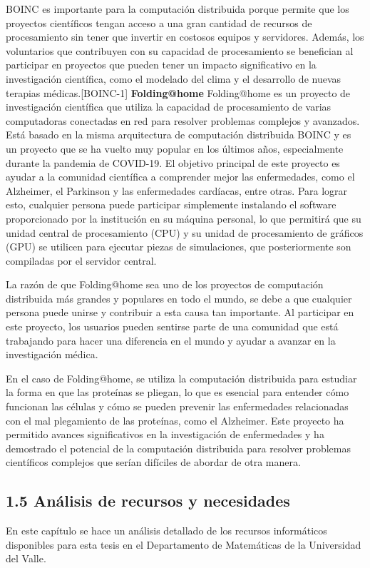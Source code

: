 \begin{doublespace}
\begin{multicols}{2}
  BOINC es importante para la computación distribuida porque permite que los proyectos científicos tengan acceso a una gran cantidad de recursos de procesamiento sin tener que invertir en costosos equipos y servidores. Además, los voluntarios que contribuyen con su capacidad de procesamiento se benefician al participar en proyectos que pueden tener un impacto significativo en la investigación científica, como el modelado del clima y el desarrollo de nuevas terapias médicas.[BOINC-1]
  \newpage
  \textbf{Folding@home}
  \newline
  Folding@home es un proyecto de investigación científica que utiliza la capacidad de procesamiento de varias computadoras conectadas en red para resolver problemas complejos y avanzados. Está basado en la misma arquitectura de computación distribuida BOINC y es un proyecto que se ha vuelto muy popular en los últimos años, especialmente durante la pandemia de COVID-19. El objetivo principal de este proyecto es ayudar a la comunidad científica a comprender mejor las enfermedades, como el Alzheimer, el Parkinson y las enfermedades cardíacas, entre otras. Para lograr esto, cualquier persona puede participar simplemente instalando el software proporcionado por la institución en su máquina personal, lo que permitirá que su unidad central de procesamiento (CPU) y su unidad de procesamiento de gráficos (GPU) se utilicen para ejecutar piezas de simulaciones, que posteriormente son compiladas por el servidor central.

  La razón de que Folding@home sea uno de los proyectos de computación distribuida más grandes y populares en todo el mundo, se debe a que cualquier persona puede unirse y contribuir a esta causa tan importante. Al participar en este proyecto, los usuarios pueden sentirse parte de una comunidad que está trabajando para hacer una diferencia en el mundo y ayudar a avanzar en la investigación médica.

  En el caso de Folding@home, se utiliza la computación distribuida para estudiar la forma en que las proteínas se pliegan, lo que es esencial para entender cómo funcionan las células y cómo se pueden prevenir las enfermedades relacionadas con el mal plegamiento de las proteínas, como el Alzheimer. Este proyecto ha permitido avances significativos en la investigación de enfermedades y ha demostrado el potencial de la computación distribuida para resolver problemas científicos complejos que serían difíciles de abordar de otra manera.
  \subsection{1.5 Análisis de recursos y necesidades}
  En este capítulo se hace un análisis detallado de los recursos informáticos disponibles para esta tesis en el Departamento de Matemáticas de la Universidad del Valle.


\end{multicols}
\end{doublespace}

